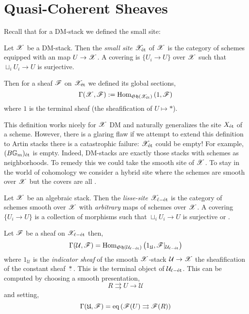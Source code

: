 \documentclass[12pt]{article}
\begin{document}
\section{Quasi-Coherent Sheaves}

Recall that for a DM-stack we defined the small \etale site:

\begin{defn}
Let $\mathscr{X}$ be a DM-stack. Then the \textit{small \etale site} $\mathscr{X}_{\text{\'{e}t}}$ of $\mathscr{X}$ is the category of schemes equipped with an \etale map $U \to \mathscr{X}$. A covering is $\{ U_i \to U \}$ over $\mathscr{X}$ such that $\sqcup_i U_i \to U$ is surjective.
\end{defn}

Then for a sheaf $\mathscr{F}$ on $\mathscr{X}_{\text{\'{e}t}}$ we defined its global sections,
\[ \Gamma(\mathscr{X}, \mathscr{F}) := \mathrm{Hom}_{\mathfrak{Sh}(\mathscr{X}_{\text{\'{e}t}})} \left( 1, \mathscr{F} \right) \]
where $1$ is the terminal sheaf (the sheafification of $U \mapsto *$). 

\begin{rmk}
This definition works nicely for $\mathscr{X}$ DM and naturally generalizes the \etale site $X_{\text{\'{e}t}}$ of a scheme. However, there is a glaring flaw if we attempt to extend this definition to Artin stacks there is a catastrophic failure: $\mathscr{X}_{\text{\'{e}t}}$ could be empty! For example, $(B {\mathbb{G}_m})_{\text{\'{e}t}}$ is empty. Indeed, DM-stacks are exactly those stacks with schemes as \etale neighborhoods. To remedy this we could take the smooth site of $\mathscr{X}$. To stay in the world of \etale cohomology we consider a hybrid site where the schemes are smooth over $\mathscr{X}$ but the covers are all \etale.
\end{rmk}

\newcommand{\lisset}{\ell-\et}
\newcommand{\Y}{\mathcal{Y}}
\newcommand{\Zar}{\mathrm{Zar}}
\newcommand{\B}{\mathbf{B}}
\newcommand{\fU}{\mathfrak{U}}
\renewcommand{\QCoh}{\mathrm{QCoh}}
\newcommand{\DD}{\mathrm{DD}}
\newcommand{\cU}{\mathcal{U}}


\begin{defn}
Let $\mathscr{X}$ be an algebraic stack. Then the \textit{lisse-\etale site} $\X_{\lisset}$ is the category of schemes smooth over $\mathscr{X}$ with \textit{arbitrary} maps of schemes over $\mathscr{X}$. A covering $\{ U_i \to U \}$ is a collection of morphisms such that $\sqcup_i U_i \to U$ is surjective or \etale.
\end{defn}

\begin{defn}
Let $\mathscr{F}$ be a sheaf on $\X_{\lisset}$ then,
\[ \Gamma(\cU, \F) = \Hom{\Sh(\cU_{\lisset})}{1_{\fU}}{\F|_{\cU_{\lisset}}} \]
where $1_{\cU}$ is the \textit{indicator sheaf} of the smooth $\mathscr{X}$-stack $\cU \to \X$ the sheafification of the constant sheaf $\underline{*}$. This is the terminal object of $\cU_{\lisset}$.
This can be computed by choosing a smooth presentation,
\[ R \rightrightarrows U \to \cU \]
and setting,
\[ \Gamma(\fU, \F) = \eq \left( \F(U) \rightrightarrows \F(R) \right) \] 
\end{defn}
\end{document}
